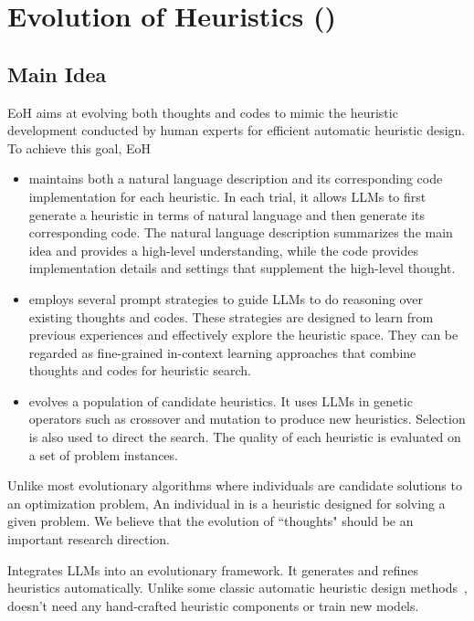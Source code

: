 \section{Evolution of Heuristics (\ourmethod{})} \label{sec:method}


\subsection{Main Idea}

EoH aims at evolving both thoughts and codes to mimic the heuristic development conducted by human experts for efficient automatic heuristic design. To achieve this goal, EoH 
\begin{itemize}
    \item maintains both a natural language description and its corresponding code implementation for each heuristic. In each trial, it allows LLMs to first generate a heuristic in terms of natural language and then generate its corresponding code. The natural language description summarizes the main idea and provides a high-level understanding, while the code provides implementation details and settings that supplement the high-level thought.
    \item employs several prompt strategies to guide LLMs to do reasoning over existing thoughts and codes. These strategies are designed to learn from previous experiences and effectively explore the heuristic space. They can be regarded as fine-grained in-context learning approaches that combine thoughts and codes for heuristic search.
    \item evolves a population of candidate heuristics.  It uses LLMs in genetic operators such as crossover and mutation to produce new heuristics. Selection is also used to direct the search. The quality of each heuristic is evaluated on a set of problem instances.     
\end{itemize}
Unlike most evolutionary algorithms where individuals are candidate solutions to an optimization problem, An individual in \ourmethod{} is a heuristic designed for solving a given problem. We believe that the evolution of ``thoughts" should be an important research direction.      


 \ourmethod{} Integrates LLMs into an evolutionary framework. It generates and refines heuristics automatically. Unlike some classic automatic heuristic design methods~\cite{burke2013hyper}, \ourmethod{} doesn't need any 
 hand-crafted heuristic components or train new models.
 
